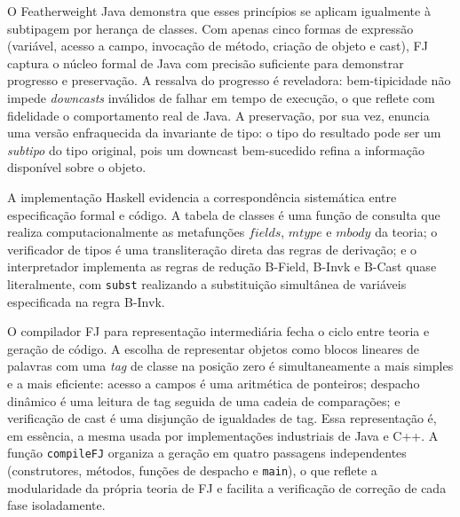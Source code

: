 O Featherweight Java demonstra que esses princípios se aplicam
igualmente à subtipagem por herança de classes. Com apenas cinco formas
de expressão (variável, acesso a campo, invocação de método, criação
de objeto e cast), FJ captura o núcleo formal de Java com precisão
suficiente para demonstrar progresso e preservação. A ressalva do
progresso é reveladora: bem-tipicidade não impede \emph{downcasts}
inválidos de falhar em tempo de execução, o que reflete com fidelidade
o comportamento real de Java. A preservação, por sua vez, enuncia uma
versão enfraquecida da invariante de tipo: o tipo do resultado pode ser
um \emph{subtipo} do tipo original, pois um downcast bem-sucedido
refina a informação disponível sobre o objeto.

A implementação Haskell evidencia a correspondência sistemática entre
especificação formal e código. A tabela de classes é uma função de
consulta que realiza computacionalmente as metafunções
\(\mathit{fields}\), \(\mathit{mtype}\) e \(\mathit{mbody}\) da teoria;
o verificador de tipos é uma transliteração direta das regras de
derivação; e o interpretador implementa as regras de redução B-Field,
B-Invk e B-Cast quase literalmente, com \texttt{subst} realizando a
substituição simultânea de variáveis especificada na regra B-Invk.

O compilador FJ para representação intermediária fecha o ciclo entre
teoria e geração de código. A escolha de representar objetos como blocos
lineares de palavras com uma \emph{tag} de classe na posição zero é
simultaneamente a mais simples e a mais eficiente: acesso a campos é uma
aritmética de ponteiros; despacho dinâmico é uma leitura de tag seguida
de uma cadeia de comparações; e verificação de cast é uma disjunção de
igualdades de tag. Essa representação é, em essência, a mesma usada por
implementações industriais de Java e C++. A função
\texttt{compileFJ} organiza a geração em quatro passagens independentes
(construtores, métodos, funções de despacho e \texttt{main}), o que
reflete a modularidade da própria teoria de FJ e facilita a verificação
de correção de cada fase isoladamente.
